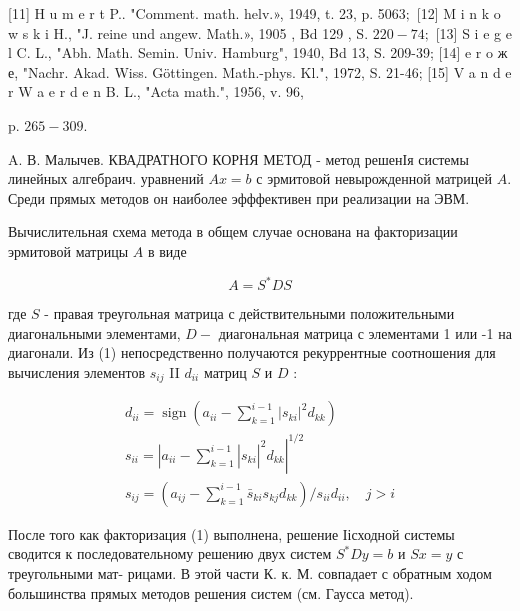 \documentclass[10pt]{article}
\begin{document}
[11] H u m e r t P.. "Comment. math. helv.», 1949, t. 23, p. 50$63 ;$ [12] M i n k o w s k i H., "J. reine und angew. Math.», 1905 , Bd 129 , S. $220-74 ;$ [13] S i e g e l C. L., "Abh. Math. Semin. Univ. Hamburg", 1940, Bd 13, S. 209-39; [14] e r o ж е, "Nachr. Akad. Wiss. Göttingen. Math.-phys. Kl.", 1972, S. 21-46; [15] V a n d e r W a e r d e n B. L., "Acta math.", 1956, v. 96,

p. $265-309$.

A. В. Малычев. КВАДРАТНОГО КОРНЯ МЕТОД - метод решенІя системы линейных алгебраич. уравнений $A x=b$ с эрмитовой невырожденной матрицей $A$. Среди прямых методов он наиболее эфффективен при реализации на ЭВМ.



Вычислительная схема метода в общем случае основана на факторизации эрмитовой матрицы $A$ в виде



\[

A=S^{*} D S

\]



где $S$ - правая треугольная матрица с действительными положительными диагональными элементами, $D-$ диагональная матрица с элементами 1 или -1 на диагонали. Из (1) непосредственно получаются рекуррентные соотношения для вычисления элементов $s_{i j}$ II $d_{i i}$ матриц $S$ и $D$ :



\[

\begin{gathered}

d_{i i}=\operatorname{sign}\left(a_{i i}-\sum_{k=1}^{i-1}\left|s_{k i}\right|^{2} d_{k k}\right) \\

s_{i i}=\left.\left.\left|a_{i i}-\sum_{k=1}^{i-1}\right| s_{k i}\right|^{2} d_{k k}\right|^{1 / 2} \\

s_{i j}=\left(a_{i j}-\sum_{k=1}^{i-1} \bar{s}_{k i} s_{k j} d_{k k}\right) / s_{i i} d_{i i}, \quad j>i

\end{gathered}

\]



После того как факторизация (1) выполнена, решение Іісходной системы сводится к последовательному решению двух систем $S^{*} D y=b$ и $S x=y$ с треугольными мат- рицами. В этой части К. к. М. совпадает с обратным ходом большинства прямых методов решения систем (см. Гаусса метод).
\end{document}
